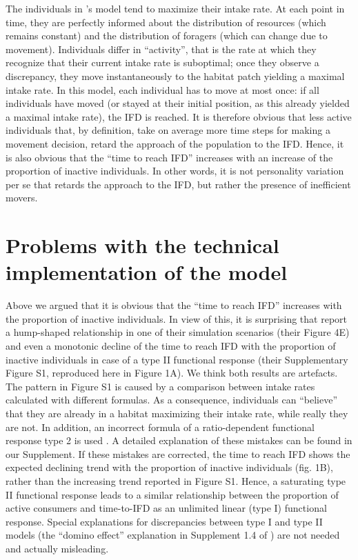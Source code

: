 	The individuals in \citeauthor{dinuzzo2020}'s model tend to maximize their intake rate.
	At each point in time, they are perfectly informed about the distribution of resources (which remains constant) and the distribution of foragers (which can change due to movement).
	Individuals differ in ``activity'', that is the rate at which they recognize that their current intake rate is suboptimal; once they observe a discrepancy, they move instantaneously to the habitat patch yielding a maximal intake rate.
	In this model, each individual has to move at most once: if all individuals have moved (or stayed at their initial position, as this already yielded a maximal intake rate), the IFD is reached.
	It is therefore obvious that less active individuals that, by definition, take on average more time steps for making a movement decision, retard the approach of the population to the IFD.
	Hence, it is also obvious that the ``time to reach IFD'' increases with an increase of the proportion of inactive individuals.
	In other words, it is not personality variation per se that retards the approach to the IFD, but rather the presence of inefficient movers.

	\section*{Problems with the technical implementation of the model}

	Above we argued that it is obvious that the ``time to reach IFD'' increases with the proportion of inactive individuals.
	In view of this, it is surprising that \citeauthor{dinuzzo2020} report a hump-shaped relationship in one of their simulation scenarios (their Figure 4E) and even a monotonic decline of the time to reach IFD with the proportion of inactive individuals in case of a type II functional response (their Supplementary Figure S1, reproduced here in Figure 1A).
	We think both results are artefacts.
	The pattern in Figure S1 is caused by a comparison between intake rates calculated with different formulas.
	As a consequence, individuals can “believe” that they are already in a habitat maximizing their intake rate, while really they are not.
	In addition, an incorrect formula of a ratio-dependent functional response type 2 is used \citep[following][]{abrams2000}.
	A detailed explanation of these mistakes can be found in our Supplement.
	If these mistakes are corrected, the time to reach IFD shows the expected declining trend with the proportion of inactive individuals (fig. 1B), rather than the increasing trend reported in Figure S1.
	Hence, a saturating type II functional response leads to a similar relationship between the proportion of active consumers and time-to-IFD as an unlimited linear (type I) functional response.
	Special explanations for discrepancies between type I and type II models (the ``domino effect'' explanation in Supplement 1.4 of \cite{dinuzzo2020}) are not needed and actually misleading.
	
